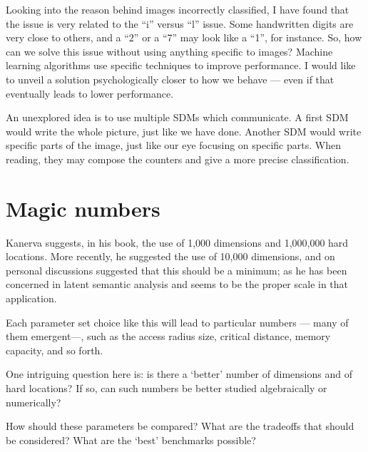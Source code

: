 Looking into the reason behind images incorrectly classified, I have found that the issue is very related to the ``i'' versus ``l'' issue. Some handwritten digits are very close to others, and a ``2'' or a ``7'' may look like a ``1'', for instance. So, how can we solve this issue without using anything specific to images?  Machine learning algorithms use specific techniques to improve performance. I would like to unveil a solution psychologically closer to how we behave --- even if that eventually leads to lower performance.

An unexplored idea is to use multiple SDMs which communicate. A first SDM would write the whole picture, just like we have done. Another SDM would write specific parts of the image, just like our eye focusing on specific parts. When reading, they may compose the counters and give a more precise classification.





\section{Magic numbers}

Kanerva suggests, in his book, the use of 1,000 dimensions and 1,000,000 hard locations.  More recently, he suggested the use of 10,000 dimensions, and on personal discussions suggested that this should be a minimum; as he has been concerned in latent semantic analysis and seems to be the proper scale in that application.

Each parameter set choice like this will lead to particular numbers --- many of them emergent---, such as the access radius size, critical distance, memory capacity, and so forth.

One intriguing question here is:  is there a `better' number of dimensions and of hard locations?  If so, can such numbers be better studied algebraically or numerically?

How should these parameters be compared?  What are the tradeoffs that should be considered?  What are the `best' benchmarks possible?




